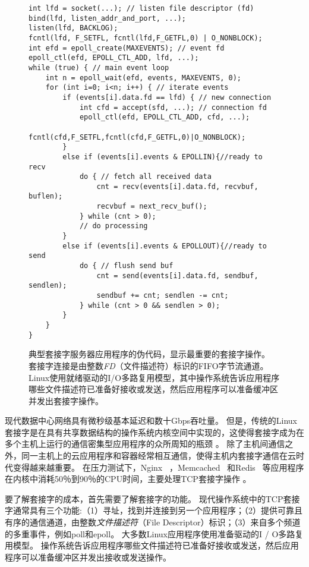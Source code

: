 \begin{figure}[htbp]
\begin{lstlisting}[style=myCStyle]
int lfd = socket(...); // listen file descriptor (fd)
bind(lfd, listen_addr_and_port, ...);
listen(lfd, BACKLOG);
fcntl(lfd, F_SETFL, fcntl(lfd,F_GETFL,0) | O_NONBLOCK);
int efd = epoll_create(MAXEVENTS); // event fd
epoll_ctl(efd, EPOLL_CTL_ADD, lfd, ...);
while (true) { // main event loop
	int n = epoll_wait(efd, events, MAXEVENTS, 0);
	for (int i=0; i<n; i++) { // iterate events
		if (events[i].data.fd == lfd) { // new connection
			int cfd = accept(sfd, ...); // connection fd
			epoll_ctl(efd, EPOLL_CTL_ADD, cfd, ...);
			fcntl(cfd,F_SETFL,fcntl(cfd,F_GETFL,0)|O_NONBLOCK);
		}
		else if (events[i].events & EPOLLIN){//ready to recv
			do { // fetch all received data
				cnt = recv(events[i].data.fd, recvbuf, buflen);
				recvbuf = next_recv_buf();
			} while (cnt > 0);
			// do processing
		}
		else if (events[i].events & EPOLLOUT){//ready to send
			do { // flush send buf
				cnt = send(events[i].data.fd, sendbuf, sendlen);
				sendbuf += cnt; sendlen -= cnt;
			} while (cnt > 0 && sendlen > 0);
		}
	}
}
\end{lstlisting}

\caption{典型套接字服务器应用程序的伪代码，显示最重要的套接字操作。 套接字连接是由整数\emph {FD}（文件描述符）标识的FIFO字节流通道。 Linux使用就绪驱动的I/O多路复用模型，其中操作系统告诉应用程序哪些文件描述符已准备好接收或发送，然后应用程序可以准备缓冲区并发出套接字操作。}
\label{socksdirect:fig:socket-pseudo-code}
\end{figure}


现代数据中心网络具有微秒级基本延迟和数十Gbps吞吐量。 但是，传统的Linux套接字是在具有共享数据结构的操作系统内核空间中实现的，这使得套接字成为在多个主机上运行的通信密集型应用程序的众所周知的瓶颈 \cite {barroso2017attack}。 除了主机间通信之外，同一主机上的云应用程序和容器经常相互通信，使得主机内套接字通信在云时代变得越来越重要。 在压力测试下，Nginx~ \cite {reese2008nginx}，Memcached~ \cite {fitzpatrick2004distributed}和Redis~ \cite {carlson2013redis}等应用程序在内核中消耗50％到90％的CPU时间，主要处理TCP套接字操作 \cite{jeong2014mtcp}。

要了解套接字的成本，首先需要了解套接字的功能。
现代操作系统中的TCP套接字通常具有三个功能:（1）寻址，找到并连接到另一个应用程序；（2）提供可靠且有序的通信通道，由整数\emph {文件描述符}（File Descriptor）标识；（3）来自多个频道的多重事件，例如poll和epoll。 大多数Linux应用程序使用准备驱动的I / O多路复用模型。 操作系统告诉应用程序哪些文件描述符已准备好接收或发送，然后应用程序可以准备缓冲区并发出接收或发送操作。

